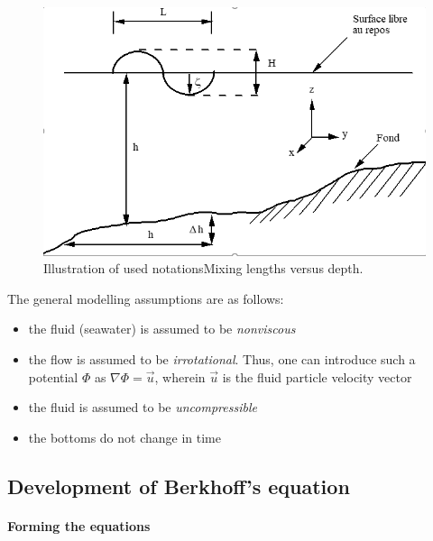 \begin{figure}[H]%
\begin{center}
%
  \includegraphics[width=\textwidth]{./graphics/notations}
%
\end{center}
\caption{Illustration of used notationsMixing lengths versus depth.}\label{fig:notations}
\end{figure}

The general modelling assumptions are as follows:

\begin{itemize}
\item  the fluid (seawater) is assumed to be \textit{nonviscous}

\item  the flow is assumed to be \textit{irrotational}. Thus, one can introduce
  such a potential $\Phi$ as $\nabla\Phi = \overrightarrow{u}$, wherein  $\overrightarrow{u}$ is the
    fluid particle velocity vector

\item  the fluid is assumed to be \textit{uncompressible}

\item  the bottoms do not change in time
\end{itemize}


\subsection{Development of Berkhoff's equation}


\paragraph{Forming the equations}

